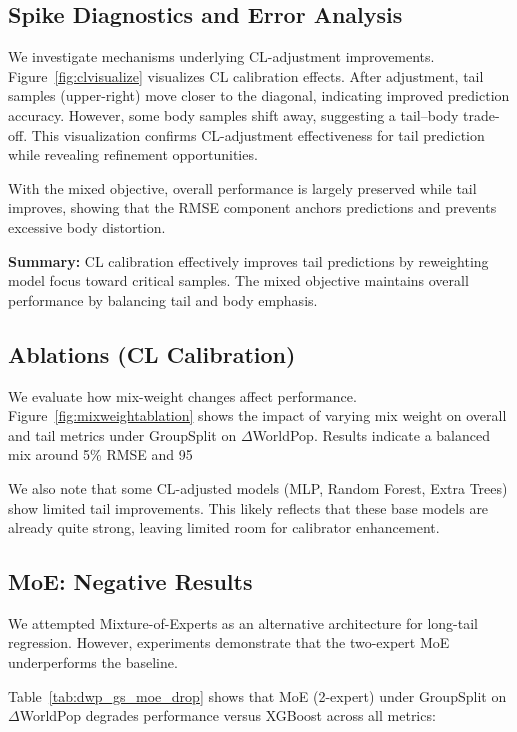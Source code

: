 \documentclass[11pt,conference,onecolumn]{IEEEtran}
\begin{document}
\subsection{Spike Diagnostics and Error Analysis}

We investigate mechanisms underlying CL-adjustment improvements. Figure~\ref{fig:clvisualize} visualizes CL calibration effects. After adjustment, tail samples (upper-right) move closer to the diagonal, indicating improved prediction accuracy. However, some body samples shift away, suggesting a tail–body trade-off. This visualization confirms CL-adjustment effectiveness for tail prediction while revealing refinement opportunities.

With the mixed objective, overall performance is largely preserved while tail improves, showing that the RMSE component anchors predictions and prevents excessive body distortion.

\textbf{Summary:} CL calibration effectively improves tail predictions by reweighting model focus toward critical samples. The mixed objective maintains overall performance by balancing tail and body emphasis.

\subsection{Ablations (CL Calibration)}

We evaluate how mix-weight changes affect performance. Figure~\ref{fig:mixweightablation} shows the impact of varying mix weight on overall and tail metrics under GroupSplit on $\Delta$WorldPop. Results indicate a balanced mix around 5\% RMSE and 95%

We also note that some CL-adjusted models (MLP, Random Forest, Extra Trees) show limited tail improvements. This likely reflects that these base models are already quite strong, leaving limited room for calibrator enhancement.

\subsection{MoE: Negative Results}

We attempted Mixture-of-Experts as an alternative architecture for long-tail regression. However, experiments demonstrate that the two-expert MoE underperforms the baseline.

Table~\ref{tab:dwp_gs_moe_drop} shows that MoE (2-expert) under GroupSplit on $\Delta$WorldPop degrades performance versus XGBoost across all metrics:
\end{document}
